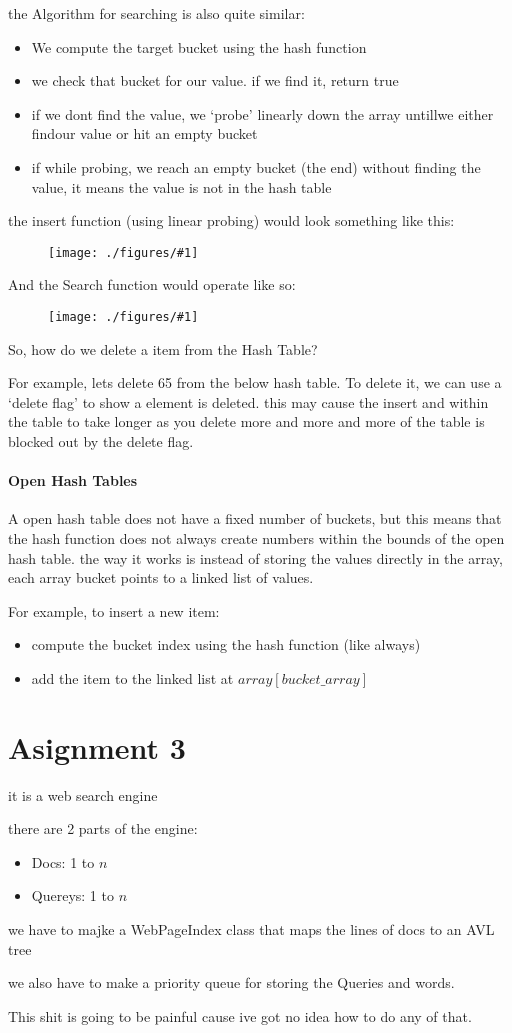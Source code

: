 \documentclass[12pt]{book}
\newcommand{\incimg}[2]{%
       \begin{figure}[h]
               \centering
               \texttt{[image: ./figures/\#1]}
       \end{figure}
}
\begin{document}
the Algorithm for searching is also quite similar:
\begin{itemize}
        \item We compute the target bucket using the hash function
        \item we check that bucket for our value. if we find it, return true
        \item if we dont find the value, we `probe' linearly down the array untillwe either findour value or hit an empty bucket
        \item if while probing, we reach an empty bucket (the end) without finding the value, it means the value is not in the hash table
\end{itemize}

the insert function (using linear probing) would look something like this:
\incimg{linProbe}{0.5}

And the Search function would operate like so:
\incimg{linSearch}{0.5}
\pagebreak

So, how do we delete a item from the Hash Table?

For example, lets delete 65 from the below hash table. To delete it, we can use a `delete flag' to show a element is deleted. this may cause the 
insert and within the table to take longer as you delete more and more and more of the table is blocked out by the delete flag.

\paragraph{Open Hash Tables}
A open hash table does not have a fixed number of buckets, but this means that the hash function does not always create numbers within the bounds of the
open hash table. the way it works is instead of storing the values directly in the array, each array bucket points to a linked list of values.

For example, to insert a new item:
\begin{itemize}
        \item compute the bucket index using the hash function (like always) 
        \item add the item to the linked list at $array[bucket\_array]$
\end{itemize}

\section*{Asignment 3}
it is a web search engine

there are 2 parts of the engine:
\begin{itemize}
        \item Docs: 1 to $n$
        \item Quereys: 1 to $n$
\end{itemize}

we have to majke a WebPageIndex class that maps the lines of docs to an AVL tree

we also have to make a priority queue for storing the Queries and words.

This shit is going to be painful cause ive got no idea how to do any of that.
\end{document}
